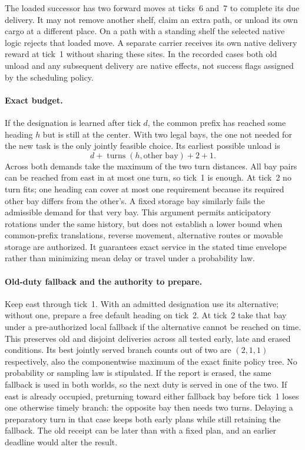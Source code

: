 \documentclass[11pt]{article}
\begin{document}
The loaded successor has two forward moves at ticks~6 and~7 to
complete its due delivery. It may not remove another shelf, claim an
extra path, or unload its own cargo at a different place. On a path
with a standing shelf the selected native logic rejects that loaded
move. A separate carrier receives its own native delivery reward
at tick~1 without sharing these sites. In the recorded cases both
old unload and any subsequent delivery are native effects, not
success flags assigned by the scheduling policy.

\paragraph{Exact budget.}
If the designation is learned after tick $d$, the common prefix
has reached some heading $h$ but is still at the center. With
two legal bays, the one not needed for the new task is the only
jointly feasible choice. Its earliest possible unload is
\[
 d + \operatorname{turns}(h,\text{other bay}) +2+1.
\]
Across both demands take the maximum of the two turn distances.
All bay pairs can be reached from east in at most one turn, so
tick~1 is enough. At tick~2 no turn fits; one heading can cover
at most one requirement because its required other bay differs
from the other's. A fixed storage bay similarly fails the
admissible demand for that very bay. This argument permits
anticipatory rotations under the same history, but does not
establish a lower bound when common-prefix translations, reverse
movement, alternative routes or movable storage are authorized.
It guarantees exact service in the stated time envelope rather
than minimizing mean delay or travel under a probability law.

\paragraph{Old-duty fallback and the authority to prepare.}
Keep east through tick~1. With an admitted designation use its
alternative; without one, prepare a free default heading on
tick~2. At tick~2 take that bay under a pre-authorized local
fallback if the alternative cannot be reached on time. This
preserves old and disjoint deliveries across all tested
early, late and erased conditions. Its best jointly served
branch counts out of two are $(2,1,1)$ respectively, also the
componentwise maximum of the exact finite policy tree.
No probability or sampling law is stipulated.
If the report is erased, the same fallback is used in both
worlds, so the next duty is served in one of the two.
If east is already occupied, preturning toward either fallback
bay before tick~1 loses one otherwise timely branch: the opposite
bay then needs two turns. Delaying a preparatory turn in that
case keeps both early plans while still retaining the fallback.
The old receipt can be later than with a fixed plan, and
an earlier deadline would alter the result.
\end{document}
